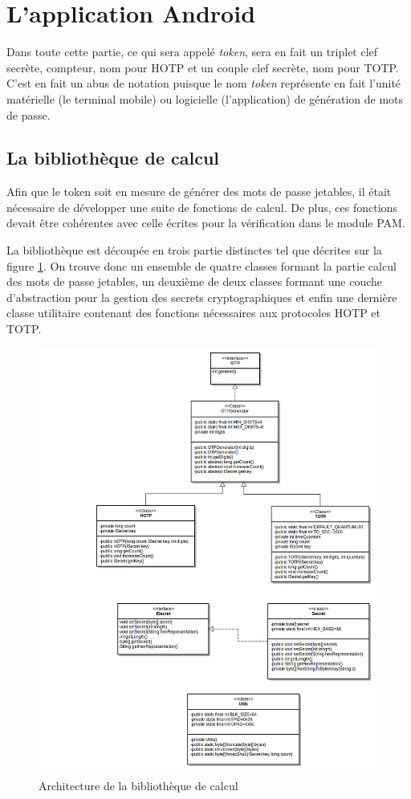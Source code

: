 \section{L'application Android}
Dans toute cette partie, ce qui sera appelé \emph{token}, sera en fait un triplet clef secrète,
compteur, nom pour HOTP et un couple clef secrète, nom pour TOTP. C'est en fait un abus de notation
puisque le nom \emph{token} représente en fait l'unité matérielle (le terminal mobile) ou logicielle
(l'application) de génération de mots de passe.

\subsection{La bibliothèque de calcul}
Afin que le token soit en mesure de générer des mots de passe jetables, il était
nécessaire de développer une suite de fonctions de calcul. De plus, ces fonctions devait
être cohérentes avec celle écrites pour la vérification dans le module PAM.

La bibliothèque est découpée en trois partie distinctes tel que décrites sur la figure
\ref{fig:umlLib}. On trouve donc un ensemble de quatre classes formant la partie calcul
des mots de passe jetables, un deuxième de deux classes formant une couche d'abstraction
pour la gestion des secrets cryptographiques et enfin une dernière classe utilitaire
contenant des fonctions nécessaires aux protocoles HOTP et TOTP.

\begin{figure}
  \centering
  \includegraphics[scale=0.4]{../graphics/uml_lib.jpg}
  \caption{Architecture de la bibliothèque de calcul}
  \label{fig:umlLib}
\end{figure}

